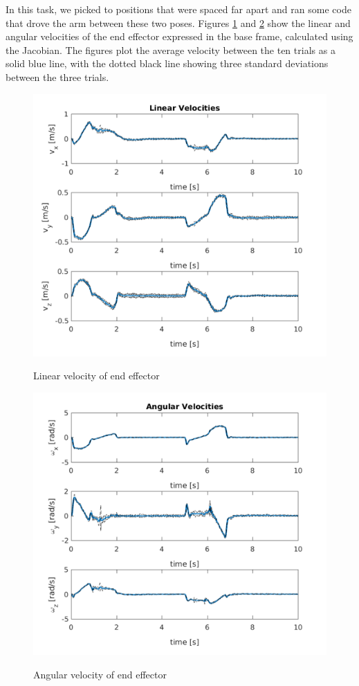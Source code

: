 \documentclass{../lab}
\begin{document}
\begin{task}
  In this task, we picked to positions that were spaced far apart and ran some code that drove the arm between these two poses. Figures \ref{jac1} and \ref{jac2} show the linear and angular velocities of the end effector expressed in the base frame, calculated using the Jacobian. The figures plot the average velocity between the ten trials as a solid blue line, with the dotted black line showing three standard deviations between the three trials. 

  \begin{figure}[H]
    \centering
    \includegraphics[scale=.2]{linear_vel_avg.png}
    \label{jac1}
    \caption{Linear velocity of end effector}
  \end{figure}

  \begin{figure}[H]
    \centering
    \includegraphics[scale=.2]{angular_vel_avg.png}
    \label{jac2}
    \caption{Angular velocity of end effector}
  \end{figure}


\end{task}
\end{document}
